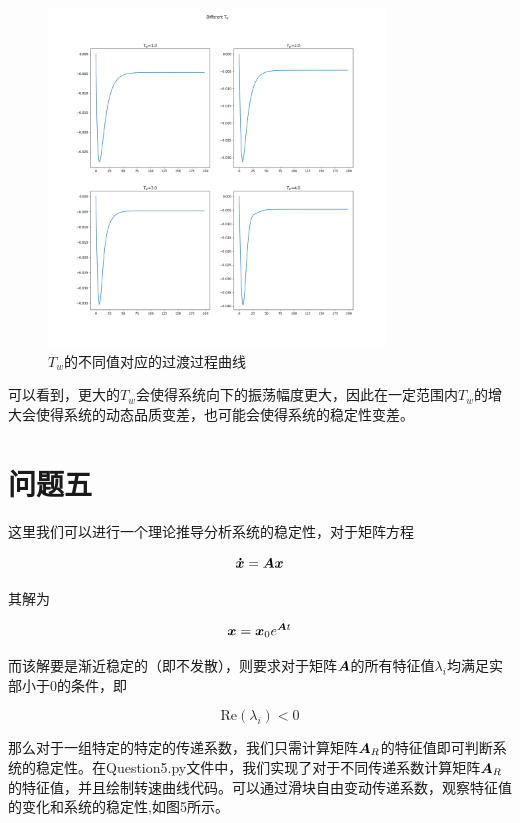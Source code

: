 \documentclass[UTF8]{ctexart}
\begin{document}
\begin{figure}[htbp]
    \centering
    \includegraphics[width=0.8\textwidth]{pic/dif_tw.png}
    \caption{$T_w$的不同值对应的过渡过程曲线}
\end{figure}

可以看到，更大的$T_w$会使得系统向下的振荡幅度更大，因此在一定范围内$T_w$的增大会使得系统的动态品质变差，也可能会使得系统的稳定性变差。

\section{问题五}

这里我们可以进行一个理论推导分析系统的稳定性，对于矩阵方程

\begin{equation}
  \boldsymbol{\dot x} = \boldsymbol{A} \boldsymbol{x}
\end{equation}

其解为

\begin{equation}
  \boldsymbol{x} = \boldsymbol{x}_0 e^{\boldsymbol{A} t}
\end{equation}

而该解要是渐近稳定的（即不发散），则要求对于矩阵$\boldsymbol{A}$的所有特征值$\lambda_i$均满足实部小于0的条件，即

\begin{equation}
  \text{Re}(\lambda_i) < 0  
\end{equation}

那么对于一组特定的特定的传递系数，我们只需计算矩阵$\boldsymbol{A}_R$的特征值即可判断系统的稳定性。在Question5.py文件中，我们实现了对于不同传递系数计算矩阵$\boldsymbol{A}_R$的特征值，并且绘制转速曲线代码。可以通过滑块自由变动传递系数，观察特征值的变化和系统的稳定性,如图5所示。
\end{document}
